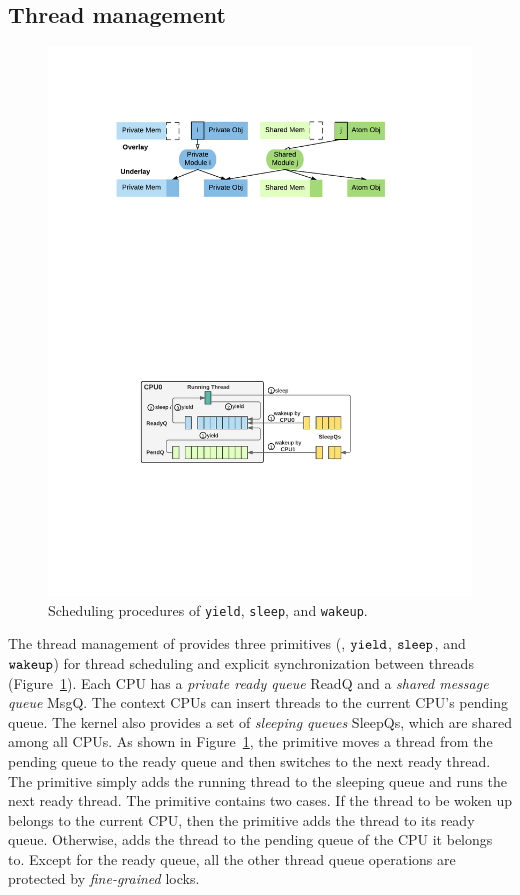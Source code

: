 {\subsection{Thread management}
\label{sec:con:thread}

\begin{figure}[t]\centering
\includegraphics[scale=1.4]{figs/scheduler} 
\caption{Scheduling procedures of \texttt{yield}, \texttt{sleep},
and \texttt{wakeup}.}
\label{fig:exp:fig:scheduler}
\hrulefill
\end{figure}

The thread management of \cCTOS{}
provides three primitives
(\ie, ${\texttt{yield}}$, ${\texttt{sleep}}$, and ${\texttt{wakeup}}$)
for  thread scheduling and explicit synchronization between threads
(\cf Figure~\ref{fig:exp:fig:scheduler}). 
Each CPU has a \emph{private ready queue} ReadQ
and a \emph{shared message queue} MsgQ.
The context CPUs can insert threads to the current CPU's pending queue.
The {\cCTOS} kernel also provides a set of \emph{sleeping queues} SleepQs, which are
shared among all CPUs.
As shown in Figure~\ref{fig:exp:fig:scheduler},
the  primitive moves a thread from
the pending queue to the ready queue
and then switches to the next ready thread.
The  primitive simply adds the running thread to the sleeping
queue and runs the next ready thread.
The  primitive contains two cases.
If the thread to be woken up belongs to the current CPU,
then the primitive adds the thread to its ready queue.
Otherwise,  adds the thread to the pending queue of the CPU it belongs to.
Except for the ready queue,
all the other thread queue operations are protected by \emph{fine-grained} locks.

}
